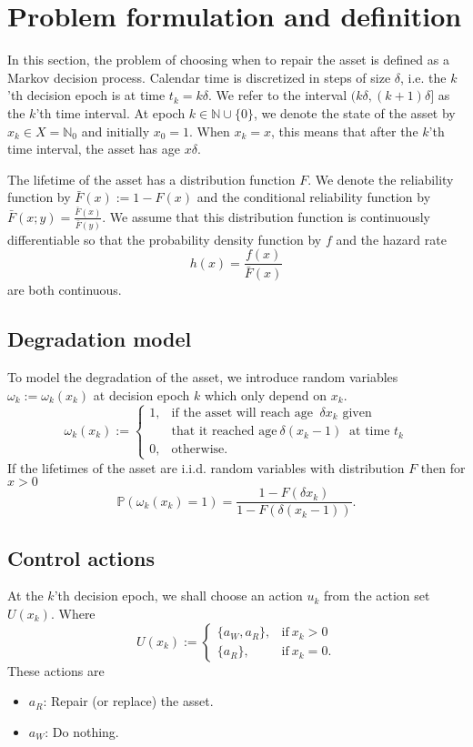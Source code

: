 \documentclass[a4paper]{thesis}
\theoremstyle{definition}
\begin{document}
\section{Problem formulation and definition}\label{section:AgeBasedDefinition}
In this section, the problem of choosing when to repair the asset is defined as a Markov decision process.
Calendar time is discretized in steps of size $\delta$, i.e. the $k$'th decision epoch is at time $t_k=k\delta$.
We refer to the interval $(k\delta,(k+1)\delta]$ as the $k$'th time interval.
At epoch $k\in\mathbb{N}\cup\{0\}$, we denote the state of the asset by $x_k\in X=\mathbb{N}_0$ and initially $x_0=1$.
When $x_k=x$, this means that after the $k$'th time interval, the asset has age $x\delta$.

The lifetime of the asset has a distribution function $F$.
We denote the reliability function by $\bar F(x):=1-F(x)$ and the conditional reliability function by $\bar F(x;y)=\frac{\bar F(x)}{\bar F(y)}$.
We assume that this distribution function is continuously differentiable so that the probability density function by $f$ and the hazard rate 
\[
h(x)=\frac{f(x)}{\bar F(x)}
\] 
are both continuous.

\subsection{Degradation model}
To model the degradation of the asset, we introduce random variables $\omega_k:=\omega_k(x_k)$ at decision epoch $k$ which only depend on $x_k$.
$$
\omega_k(x_k):=\begin{cases}
1,&\text{if the asset will reach age }\ \delta x_{k}\text{ given}\\
&\text{that it reached age}\ \delta(x_k-1)\ \text{ at time } t_k \\
0,&\text{otherwise}.
\end{cases}
$$
If the lifetimes of the asset are i.i.d. random variables with distribution $F$ then for $x>0$
$$
\mathbb{P}(\omega_k(x_k)=1)=\frac{1-F(\delta x_k)}{1-F(\delta (x_k-1))}.
$$

\subsection{Control actions}
At the $k$'th decision epoch, we shall choose an action $u_k$ from the action set $U(x_k)$.
Where
$$
U(x_k):=\begin{cases}
\{a_W,a_R\},&\text{if}\ x_k>0 \\
\{a_R\},&\text{if}\ x_k=0.
\end{cases}
$$
These actions are
\begin{itemize}
	\item $a_R$:
	Repair (or replace) the asset.
	\item $a_W$:
	Do nothing.
\end{itemize}
\end{document}
